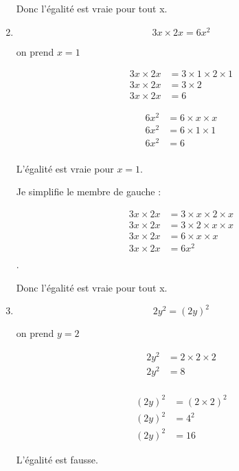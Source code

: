 \documentclass[12pt,a4paper]{article}
\begin{document}
\begin{enumerate}
	Donc l'égalité est vraie pour tout x.
	
	
	
	\item \begin{equation*}
	3x \times 2x = 6x^2
	\end{equation*}
	
	on prend $x = 1$ 
	
	\begin{multicols}{2}
		\begin{align*}
		3x \times 2x &= 3 \times 1 \times 2 \times 1 \\
		3x \times 2x &= 3 \times 2\\
		3x \times 2x &= 6
		\end{align*} 
		
		
		\begin{align*}
			6x^2 &= 6 \times x \times x \\
			6x^2 &= 6 \times 1 \times 1 \\
			6x^2 &= 6\\
		\end{align*}
		
	\end{multicols}
	
	L'égalité est vraie pour $x=1$.
	
	Je simplifie le membre de gauche :
	
	\begin{align*}
		3x \times 2x &=  3 \times x \times  2 \times x \\
		3x \times 2x &=  3 \times 2 \times  x \times x \\
		3x \times 2x &=  6 \times  x \times x \\
		3x \times 2x &=  6x^2 \\
	\end{align*}.
	
	Donc l'égalité est vraie pour tout x.

	\newpage
	
	\item \begin{equation*}
		2y^2 = (2y)^2 
	\end{equation*}
	
	on prend $y = 2$ 
	
	\begin{multicols}{2}
		\begin{align*}
			2y^2 &= 2 \times 2 \times 2 \\
			2y^2 &= 8 \\			
		\end{align*} 
		
		
		\begin{align*}
			(2y)^2 &= (2 \times 2)^2 \\
			(2y)^2 &= 4^2 \\
			(2y)^2 &= 16 
		\end{align*}
		
	\end{multicols}
	
	L'égalité est fausse.
\end{enumerate}
\end{document}

